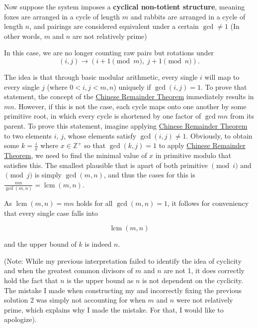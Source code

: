\begin{enumerate}
 Now suppose the system imposes a \textbf{cyclical non-totient structure}, meaning foxes are arranged in a cycle of length $m$ and rabbits are arranged in a cycle of length $n$, and pairings are considered equivalent under a certain $\gcd \neq 1$ (In other words, $m$ and $n$ are not relatively prime)

 In this case, we are no longer counting raw pairs but rotations under
 \[(i,j) \rightarrow (i+1 \pmod m,\; j+1 \pmod n).\]

 The idea is that through basic modular arithmetic, every single $i$ will map to every single $j$ (where $0 < i,j < m, n$) uniquely if $\gcd(i,j) = 1$. To prove that statement, the concept of the \href{https://artofproblemsolving.com/wiki/index.php?title=Chinese\_Remainder\_Theorem}{Chinese Remainder Theorem} immediately results in $mn$. However, if this is not the case, each cycle maps onto one another by some primitive root, in which every cycle is shortened by one factor of $\gcd{m}{n}$ from its parent. To prove this statement, imagine applying \href{https://artofproblemsolving.com/wiki/index.php?title=Chinese\_Remainder\_Theorem}{Chinese Remainder Theorem} to two elements $i$, $j$, whose elements satisfy $\gcd(i,j) \neq 1$. Obviously, to obtain some $k = \frac{i}{x}$ where $x \in \mathbb{Z}^+$ so that $\gcd(k,j) = 1$ to apply \href{https://artofproblemsolving.com/wiki/index.php?title=Chinese\_Remainder\_Theorem}{Chinese Remainder Theorem}, we need to find the minimal value of $x$ in primitive modulo that satisfies this. The smallest plausible that is apart of both primitive $\pmod{i}$ and $\pmod{j}$ is simply $\gcd(m,n)$, and thus the cases for this is $\frac{mn}{\gcd(m,n)} = \operatorname{lcm}(m,n)$.

 As $\operatorname{lcm}(m,n) = mn$ holds for all $\gcd(m,n) = 1$, it follows for conveniency that every single case falls into 

 
 \[\operatorname{lcm}(m,n)\]

 and the upper bound of $k$ is indeed $n$.

 (Note: While my previous interpretation failed to identify the idea of cyclicity and when the greatest common divisors of $m$ and $n$ are not 1, it does correctly hold the fact that $n$ is the upper bound as $n$ is not dependent on the cyclicity. The mistake I made when constructing my and incorrectly fixing the previous solution 2 was simply not accounting for when $m$ and $n$ were not relatively prime, which explains why I made the mistake. For that, I would like to apologize).


\end{enumerate}
